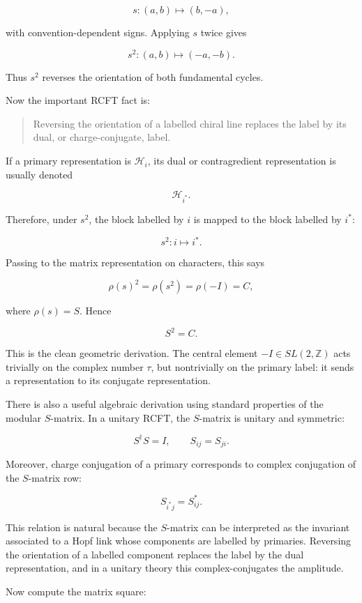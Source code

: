 \documentclass[
  10pt,
  a4paper,
  openany]{book}
\begin{document}
\[
s:
(a,b)
\mapsto
(b,-a),
\]

with convention-dependent signs. Applying \(s\) twice gives

\[
s^2:
(a,b)
\mapsto
(-a,-b).
\]

Thus \(s^2\) reverses the orientation of both fundamental cycles.

Now the important RCFT fact is:

\begin{quote}
Reversing the orientation of a labelled chiral line replaces the label
by its dual, or charge-conjugate, label.
\end{quote}

If a primary representation is \(\mathcal H_i\), its dual or
contragredient representation is usually denoted

\[
\mathcal H_{i^*}.
\]

Therefore, under \(s^2\), the block labelled by \(i\) is mapped to the
block labelled by \(i^*\):

\[
s^2:
i
\mapsto
i^*.
\]

Passing to the matrix representation on characters, this says

\[
\rho(s)^2
=
\rho(s^2)
=
\rho(-I)
=
C,
\]

where \(\rho(s)=S\). Hence

\[
S^2=C.
\]

This is the clean geometric derivation. The central element
\(-I \in SL(2,\mathbb Z)\) acts trivially on the complex number
\(\tau\), but nontrivially on the primary label: it sends a
representation to its conjugate representation.

There is also a useful algebraic derivation using standard properties of
the modular \(S\)-matrix. In a unitary RCFT, the \(S\)-matrix is unitary
and symmetric:

\[
S^\dagger S = I,
\qquad
S_{ij}=S_{ji}.
\]

Moreover, charge conjugation of a primary corresponds to complex
conjugation of the \(S\)-matrix row:

\[
S_{i^*j}
=
S_{ij}^*.
\]

This relation is natural because the \(S\)-matrix can be interpreted as
the invariant associated to a Hopf link whose components are labelled by
primaries. Reversing the orientation of a labelled component replaces
the label by the dual representation, and in a unitary theory this
complex-conjugates the amplitude.

Now compute the matrix square:
\end{document}
